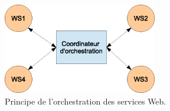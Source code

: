 \begin{figure}[h]
    \centering
    \includegraphics[width=0.6\textwidth]{figs/orchestration.eps}
    \caption{Principe de l’orchestration des services Web.}
    \label{fig:orchestration}
\end{figure}